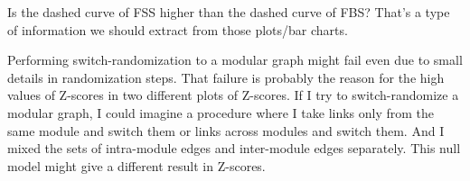 {	Is the dashed curve of FSS higher than the dashed curve of FBS? That's a type of information we should extract from those plots/bar charts.
	
	Performing switch-randomization to a modular graph might fail even due to small details in randomization steps. That failure is probably the reason for the high values of Z-scores in two different plots of Z-scores. If I try to switch-randomize a modular graph, I could imagine a procedure where I take links only from the same module and switch them or links across modules and switch them. And I mixed the sets of intra-module edges and inter-module edges separately. This null model might give a different result in Z-scores.
}
